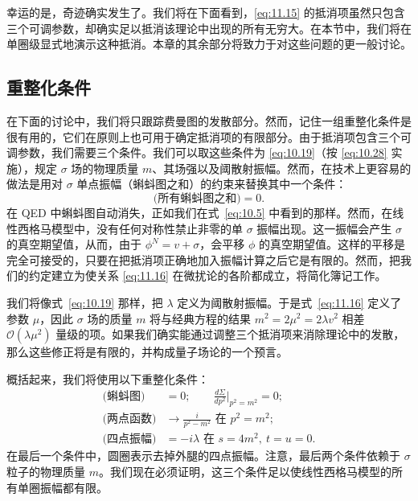 幸运的是，奇迹确实发生了。我们将在下面看到，\eqref{eq:11.15} 的抵消项虽然只包含三个可调参数，却确实足以抵消该理论中出现的所有无穷大。在本节中，我们将在单圈级显式地演示这种抵消。本章的其余部分将致力于对这些问题的更一般讨论。

\subsection{重整化条件}

在下面的讨论中，我们将只跟踪费曼图的发散部分。然而，记住一组重整化条件是很有用的，它们在原则上也可用于确定抵消项的有限部分。由于抵消项包含三个可调参数，我们需要三个条件。我们可以取这些条件为 \eqref{eq:10.19}（按 \eqref{eq:10.28} 实施），规定 $\sigma$ 场的物理质量 $m$、其场强以及阈散射振幅。然而，在技术上更容易的做法是用对 $\sigma$ 单点振幅（蝌蚪图之和）的约束来替换其中一个条件：
\begin{equation}
  \text{(所有蝌蚪图之和)} = 0 .
  \label{eq:11.16}
\end{equation}
在 QED 中蝌蚪图自动消失，正如我们在式~\eqref{eq:10.5} 中看到的那样。然而，在线性西格马模型中，没有任何对称性禁止非零的单 $\sigma$ 振幅出现。这一振幅会产生 $\sigma$ 的真空期望值，从而，由于 $\phi^N = v + \sigma$，会平移 $\phi$ 的真空期望值。这样的平移是完全可接受的，只要在把抵消项正确地加入振幅计算之后它是有限的。然而，把我们的约定建立为使关系 \eqref{eq:11.16} 在微扰论的各阶都成立，将简化簿记工作。

我们将像式~\eqref{eq:10.19} 那样，把 $\lambda$ 定义为阈散射振幅。于是式~\eqref{eq:11.16} 定义了参数 $\mu$，因此 $\sigma$ 场的质量 $m$ 将与经典方程的结果 $m^2 = 2\mu^2 = 2\lambda v^2$ 相差 $\mathcal{O}(\lambda\mu^2)$ 量级的项。如果我们确实能通过调整三个抵消项来消除理论中的发散，那么这些修正将是有限的，并构成量子场论的一个预言。

概括起来，我们将使用以下重整化条件：
\begin{equation}
  \begin{aligned}
    \text{(蝌蚪图)} &= 0;\qquad
    \frac{d\Sigma}{dp^2}\Big|_{p^2=m^2} = 0;\\
    \text{(两点函数)} &\to \frac{i}{p^2-m^2}
      \text{ 在 } p^2 = m^2 ;\\
    \text{(四点振幅)} &= -i\lambda \text{ 在 } s = 4m^2,\
      t = u = 0 .
  \end{aligned}
  \label{eq:11.17}
\end{equation}
在最后一个条件中，圆圈表示去掉外腿的四点振幅。注意，最后两个条件依赖于 $\sigma$ 粒子的物理质量 $m$。我们现在必须证明，这三个条件足以使线性西格马模型的所有单圈振幅都有限。


